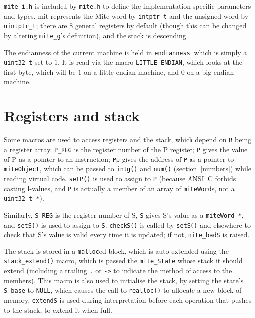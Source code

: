 \documentclass[english]{scrartcl}
\newcommand{\absfont}{\sffamily}
\newcommand{\abs}[1]{{\absfont #1}}
\begin{document}
\verb|mite_i.h| is included by \verb|mite.h| to define the
implementation-specific parameters and types. mit represents the Mite
word by \verb|intptr_t| and the unsigned word by \verb|uintptr_t|;
there are $8$ general registers by default (though this can be changed
by altering \verb|mite_g|'s definition), and the stack is descending.

The endianness of the current machine is held in \verb|endianness|,
which is simply a \verb|uint32_t| set to $1$. It is read via the macro
\verb|LITTLE_ENDIAN|, which looks at the first byte, which will be $1$
on a little-endian machine, and $0$ on a big-endian machine.



\section{Registers and stack}

Some macros are used to access registers and the stack, which depend
on \verb|R| being a register array. \verb|P_REG| is the register
number of the \abs{P} register; \verb|P| gives the value of \abs{P} as
a pointer to an instruction; \verb|Pp| gives the address of \verb|P|
as a pointer to \verb|miteObject|, which can be passed to
\verb|intg()| and \verb|num()| (section~\ref{numbers}) while reading
virtual code. \verb|setP()| is used to assign to \verb|P| (because
ANSI~C forbids casting l-values, and \verb|P| is actually a member of
an array of \verb|miteWord|s, not a \verb|uint32_t *|).

Similarly, \verb|S_REG| is the register number of \abs{S}, \verb|S|
gives \abs{S}'s value as a \verb|miteWord *|, and \verb|setS()| is
used to assign to \verb|S|. \verb|checkS()| is called by \verb|setS()|
and elsewhere to check that \abs{S}'s value is valid every time it is
updated; if not, \verb|mite_badS| is raised.

The stack is stored in a \verb|malloc|ed block, which is auto-extended
using the \verb|stack_extend()| macro, which is passed the
\verb|mite_State| whose stack it should extend (including a trailing
\verb|.| or \verb|->| to indicate the method of access to the
members). This macro is also used to initialise the stack, by setting
the state's \verb|S_base| to \verb|NULL|, which causes the call to
\verb|realloc()| to allocate a new block of memory. \verb|extendS| is
used during interpretation before each operation that pushes to the
stack, to extend it when full.
\end{document}
